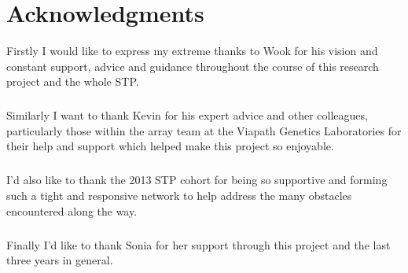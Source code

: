 \begingroup
\chapter*{Acknowledgments}
Firstly I would like to express my extreme thanks to Wook for his vision and constant support, advice and guidance throughout the course of this research project and the whole STP.
\paragraph*{}
Similarly I want to thank Kevin for his expert advice and other colleagues, particularly those within the array team at the Viapath Genetics Laboratories for their help and support which helped make this project so enjoyable.
\paragraph*{}
I'd also like to thank the 2013 STP cohort for being so supportive and forming such a tight and responsive network to help address the many obstacles encountered along the way.
\paragraph*{}
Finally I'd like to thank Sonia for her support through this project and the last three years in general.
\endgroup



